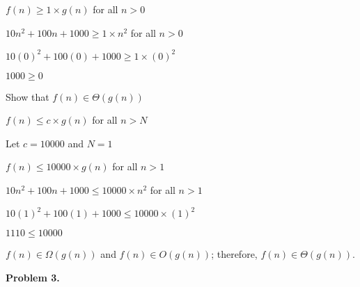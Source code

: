 \documentclass{article}
\begin{document}
	\hspace{4ex} $f(n) \geq 1 \times g(n)$  for all $n > 0$
		
	\hspace{4ex} $10n^2 + 100n + 1000 \geq 1 \times n^2$ for all $n > 0$
	
	\hspace{4ex} $10(0)^2 + 100(0) + 1000 \geq 1 \times (0)^2$
	
	\hspace{4ex} $1000 \geq 0$
	
	Show that $f(n) \in \Theta(g(n))$
	
	\hspace{4ex} $f(n) \leq c \times g(n)$ for all $n > N$
	
	\hspace{4ex} Let $c = 10000$ and $N = 1$
	
	\hspace{4ex} $f(n) \leq 10000 \times g(n)$  for all $n > 1$
	
	\hspace{4ex} $10n^2 + 100n + 1000 \leq 10000 \times n^2$ for all $n > 1$
	
	\hspace{4ex} $10(1)^2 + 100(1) + 1000 \leq 10000 \times (1)^2$
	
	\hspace{4ex} $1110 \leq 10000$
	
	$f(n) \in \Omega(g(n))$ and $f(n) \in O(g(n))$; therefore, $f(n) \in \Theta(g(n))$.
	
\newpage
	
\textbf{Problem 3.}
\end{document}
